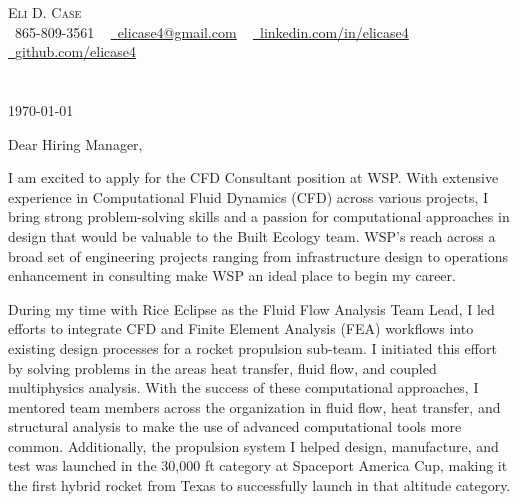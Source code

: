 \documentclass[letterpaper,11pt]{letter}
\newcommand{\paragraphbreak}{\vspace{5pt}}
\begin{document}
\begin{center}
    {\large \scshape Eli D. Case} \\ \vspace{1pt}
    \small \raisebox{-0.1\height}\faPhone\ 865-809-3561 ~ \href{mailto:elicase4@gmail.com}{\raisebox{-0.2\height}\faEnvelope\  \underline{elicase4@gmail.com}} ~ 
    \href{https://linkedin.com/in/elicase4}{\raisebox{-0.2\height}\faLinkedin\ \underline{linkedin.com/in/elicase4}}  ~
    \href{https://github.com/elicase4}{\raisebox{-0.2\height}\faGithub\ \underline{github.com/elicase4}}
    \vspace{-4pt}
\end{center}

\section{}

\today \\

\paragraphbreak

Dear Hiring Manager,

\paragraphbreak

I am excited to apply for the CFD Consultant position at WSP. With extensive experience in Computational Fluid Dynamics (CFD) across various projects, I bring strong problem-solving skills and a passion for computational approaches in design that would be valuable to the Built Ecology team. WSP's reach across a broad set of engineering projects ranging from infrastructure design to operations enhancement in consulting make WSP an ideal place to begin my career.

\paragraphbreak

During my time with Rice Eclipse as the Fluid Flow Analysis Team Lead, I led efforts to integrate CFD and Finite Element Analysis (FEA) workflows into existing design processes for a rocket propulsion sub-team. I initiated this effort by solving problems in the areas heat transfer, fluid flow, and coupled multiphysics analysis. With the success of these computational approaches, I mentored team members across the organization in fluid flow, heat transfer, and structural analysis to make the use of advanced computational tools more common. Additionally, the propulsion system I helped design, manufacture, and test was launched in the 30,000 ft category at Spaceport America Cup, making it the first hybrid rocket from Texas to successfully launch in that altitude category.

\paragraphbreak
\end{document}
